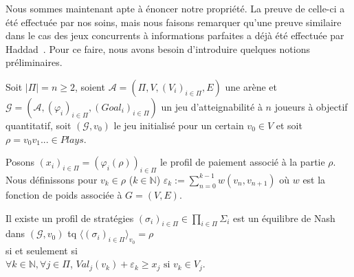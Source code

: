 Nous sommes maintenant apte à énoncer notre propriété. La preuve de celle-ci a été effectuée par nos soins, mais nous faisons remarquer qu'une preuve similaire dans le cas des jeux concurrents à informations parfaites a déjà été effectuée par Haddad~\cite{characNashEq}. Pour ce faire, nous avons besoin d'introduire quelques notions préliminaires.

\begin{propriete}
	\label{prop:rechEqpert1}
	Soit $|\Pi| = n \geq 2$,
	soient $\mathcal{A} = (\Pi, V, (V_{i})_{i\in\Pi}, E)$ une arène et $\mathcal{G} = (\mathcal{A}, (\varphi _{i})_{i\in\Pi}, (Goal_{i})_{i\in\Pi})$ un jeu d'atteignabilité à $n$ joueurs à objectif quantitatif, soit $(\mathcal{G}, v_{0})$ le jeu initialisé pour un certain $v_{0} \in V $ et soit $\rho = v_{0}v_{1}... \in Plays$. 
	
	Posons $(x_{i})_{i\in\Pi} = (\varphi _{i}(\rho))_{i\in\Pi}$ le profil de paiement associé à la partie $\rho$. Nous définissons pour $v_{k} \in \rho$ ($k \in \mathbb{N}$)  $\varepsilon _{k} := \sum _{n= 0} ^{k-1} w(v_{n},v_{n+1})$ où $w$ est la fonction de poids associée à $G = (V,E)$.
	
	\begin{center}Il existe un  profil de stratégies $ (\sigma _{i})_{i\in\Pi} \in \prod_{i\in\Pi} \Sigma _{i}$ est un équilibre de Nash dans $(\mathcal{G},v_{0})$ tq $\langle (\sigma _{i})_{i \in \Pi}\rangle_{v_0} = \rho$\\ $\text{}$\\ si et seulement si\\$\text{}$\\  $ \forall k \in \mathbb{N}, \forall j \in \Pi$, $Val_{j}(v_{k}) + \varepsilon _{k} \geq x_j \text{  si } v_{k} \in V_{j}$.\end{center}
	
\end{propriete}

\setcounter{equation}{0}

